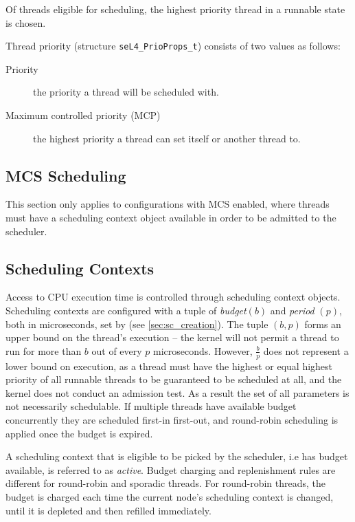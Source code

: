 Of threads eligible for scheduling, the highest priority thread in a runnable state is chosen.

Thread priority (structure \texttt{seL4\_PrioProps\_t}) consists of two values as follows:

\begin{description} \item[Priority] the priority a thread will be scheduled with.  \item[Maximum
controlled priority (MCP)] the highest priority a thread can set itself or another thread to.
\end{description}

\subsection{MCS Scheduling}

This section only applies to configurations with MCS enabled, where threads must have
a scheduling context object available in order to be admitted to the scheduler.

\subsection{Scheduling Contexts}
\label{sec:scheduling_contexts}

Access to CPU execution time is controlled through scheduling context objects.
Scheduling contexts are configured with a tuple of
\textit{budget}$(b)$ and \textit{period} $(p)$, both in microseconds, set by
 (see \autoref{sec:sc_creation}).
The tuple $(b, p)$ forms an upper bound on the thread's execution -- the kernel will not permit a
thread to run for more than $b$ out of every $p$ microseconds. However, $\frac{b}{p}$ does not
represent a lower bound on execution, as a thread must have the highest or equal highest priority
of all runnable threads to be guaranteed to be scheduled at all, and the kernel does not conduct
an admission test. As a result the set of all parameters is not necessarily schedulable. If
multiple threads have available budget concurrently they are scheduled first-in first-out, and
round-robin scheduling is applied once the budget is expired.

A scheduling context that is eligible to be picked by the scheduler, i.e has budget available, is
referred to as \emph{active}.  Budget charging and replenishment rules are different for round-robin
and sporadic threads.  For round-robin threads, the budget is charged each time the current node's
scheduling context is changed, until it is depleted and then refilled immediately.

